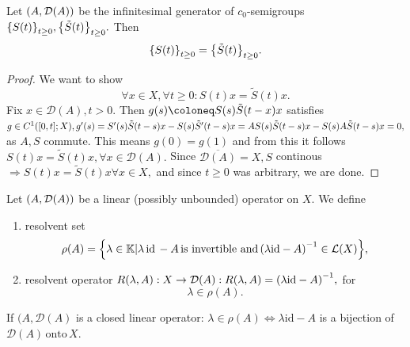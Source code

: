 \documentclass{article}
\begin{document}
\begin{lemma}
	Let $\qty(A, \mathcal{D}(A))$ be the infinitesimal generator of $c_0$-semigroups $\qty{S(t)}_{t\geq0}, \qty{\tilde{S}(t)}_{t\geq 0}.$ Then
	\[
		\qty{S(t)}_{t\geq 0} = \qty{\tilde{S}(t)}_{t \geq 0}.
	\]
\end{lemma}
\begin{proof}
    We want to show
    \[
	    \forall x \in X, \forall t\geq 0: S(t)x = \tilde{S}(t)x.
    \]
    Fix $x \in \mathcal{D}(A), t >0.$ Then $g(s) \coloneq S(s) \tilde{S}\qty(t-x)x$ satisfies $g \in C^1\qty([0,t];X), g'(s) = S'(s)\tilde{S}(t-s)x - S(s) \tilde{S}'(t-s)x = AS(s) \tilde{S}(t-s)x - S(s) A \tilde{S}\qty(t-s)x = 0,$ as $A,S$ commute. This means $g(0) = g(1)$ and from this it follows $S(t)x = \tilde{S}(t)x, \forall x \in \mathcal{D}(A).$ Since $\overline{\mathcal{D}(A)} = X, S$ continous $\Rightarrow S(t)x = \tilde{S}(t)x \forall x \in X, $ and since $t \geq 0$ was arbitrary, we are done.
\end{proof}

\begin{definition}
	Let $\qty(A, \mathcal{D}(A))$ be a linear (possibly unbounded) operator on $X$. We define 
	\begin{enumerate}
		\item resolvent set
			\[
				\rho(A) = \qty{\lambda \in \mathbb{K}| \lambda \, \text{id} \, - A \, \text{is invertible and} \, \qty(\lambda \text{id} - A)^{-1} \in \mathcal{L}(X)},
			\]
		\item resolvent operator $R(\lambda, A):X \to \mathcal{D}(A): R\qty(\lambda, A) =\qty(\lambda \text{id} - A)^{-1},$ for
			\[
				\lambda \in \rho(A).
			\]
	\end{enumerate}
	\end{definition}
\begin{remark}
	If $(A, \mathcal{D}(A)$ is a closed linear operator: $\lambda \in \rho(A) \Leftrightarrow \lambda \text{id} - A$ is a bijection of $\mathcal{D}(A) \, \text{onto} \, X.$
\end{remark}
\end{document}

